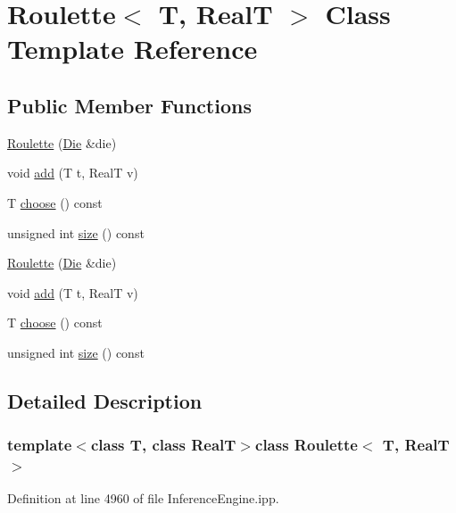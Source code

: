 \hypertarget{class_roulette}{\section{Roulette$<$ T, Real\+T $>$ Class Template Reference}
\label{class_roulette}
}
\subsection*{Public Member Functions}
\begin{DoxyCompactItemize}
\item 
\hyperlink{class_roulette_a7a3665052e6d81f3493c666748020ef4}{Roulette} (\hyperlink{class_die}{Die} \&die)
\item 
void \hyperlink{class_roulette_ac43a3ec52b47c4155a91c43186b665fb}{add} (T t, Real\+T v)
\item 
T \hyperlink{class_roulette_acf830e32e8bbde521eda0882fe80093d}{choose} () const 
\item 
unsigned int \hyperlink{class_roulette_a326ec76e4615eb7c85d7097061e60ed0}{size} () const 
\item 
\hyperlink{class_roulette_a7a3665052e6d81f3493c666748020ef4}{Roulette} (\hyperlink{class_die}{Die} \&die)
\item 
void \hyperlink{class_roulette_ac43a3ec52b47c4155a91c43186b665fb}{add} (T t, Real\+T v)
\item 
T \hyperlink{class_roulette_acf830e32e8bbde521eda0882fe80093d}{choose} () const 
\item 
unsigned int \hyperlink{class_roulette_a326ec76e4615eb7c85d7097061e60ed0}{size} () const 
\end{DoxyCompactItemize}


\subsection{Detailed Description}
\subsubsection*{template$<$class T, class Real\+T$>$class Roulette$<$ T, Real\+T $>$}



Definition at line 4960 of file Inference\+Engine.\+ipp.



